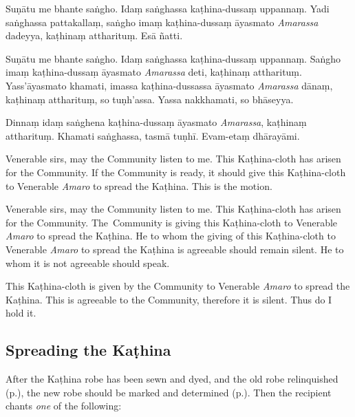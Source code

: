\enlargethispage{\baselineskip}


Suṇātu me bhante saṅgho. Idaṃ saṅghassa kaṭhina-dussaṃ uppannaṃ. Yadi saṅghassa
pattakallaṃ, saṅgho imaṃ kaṭhina-dussaṃ āyasmato \emph{Amarassa} dadeyya,
kaṭhinaṃ attharituṃ. Esā ñatti.

Suṇātu me bhante saṅgho. Idaṃ saṅghassa kaṭhina-dussaṃ uppannaṃ. Saṅgho imaṃ
kaṭhina-dussaṃ āyasmato \emph{Amarassa} deti, kaṭhinaṃ attharituṃ.
Yass'āyasmato khamati, imassa kaṭhina-dussassa āyasmato \emph{Amarassa} dānaṃ,
kaṭhinaṃ attharituṃ, so tuṇh'assa. Yassa nakkhamati, so bhāseyya.

Dinnaṃ idaṃ saṅghena kaṭhina-dussaṃ āyasmato \emph{Amarassa}, kaṭhinaṃ
attharituṃ. Khamati saṅghassa, tasmā tuṇhī. Evam-etaṃ dhārayāmi.


\begin{english}
Venerable sirs, may the Community listen to me. This Kaṭhina-cloth has arisen
for the Community. If the Community is ready, it should give this Kaṭhina-cloth
to Venerable \emph{Amaro} to spread the Kaṭhina. This is the motion.

\bigskip

Venerable sirs, may the Community listen to me. This Kaṭhina-cloth has arisen
for the Community. The~Community is giving this Kaṭhina-cloth to Venerable
\emph{Amaro} to spread the Kaṭhina. He to whom the giving of this Kaṭhina-cloth
to Venerable \emph{Amaro} to spread the Kaṭhina is agreeable should remain
silent. He to whom it is not agreeable should speak.

\bigskip

This Kaṭhina-cloth is given by the Community to Venerable \emph{Amaro} to
spread the Kaṭhina. This is agreeable to the Community, therefore it is silent.
Thus do I hold it.
\end{english}

\subsection{Spreading the Kaṭhina}
\label{spreading-the-kathina}

After the Kaṭhina robe has been sewn and dyed, and the old robe relinquished
(p.\pageref{relinquish-robe}), the new robe should be marked and determined
(p.\pageref{determine-robe}). Then the recipient chants \emph{one} of the
following:


